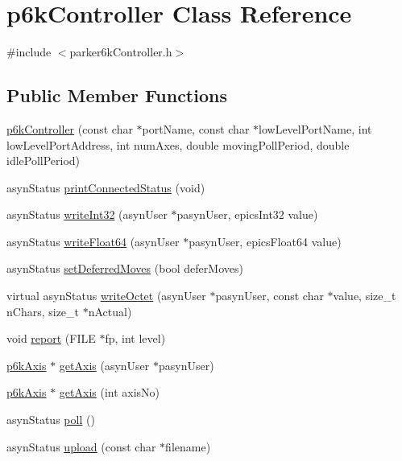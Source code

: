\hypertarget{classp6kController}{
\section{p6kController Class Reference}
\label{classp6kController}
}


{\ttfamily \#include $<$parker6kController.h$>$}\subsection*{Public Member Functions}
\begin{DoxyCompactItemize}
\item 
\hyperlink{classp6kController_ac4f52e54e4f8047ac602b2760aaa0792}{p6kController} (const char $\ast$portName, const char $\ast$lowLevelPortName, int lowLevelPortAddress, int numAxes, double movingPollPeriod, double idlePollPeriod)
\item 
asynStatus \hyperlink{classp6kController_a5089092687d5a2ebaf54d5a06d23a185}{printConnectedStatus} (void)
\item 
asynStatus \hyperlink{classp6kController_a9130075d7f114acc2a35a53a85b5431a}{writeInt32} (asynUser $\ast$pasynUser, epicsInt32 value)
\item 
asynStatus \hyperlink{classp6kController_a9a0b81dabca6419fafe18f36f9abb2e9}{writeFloat64} (asynUser $\ast$pasynUser, epicsFloat64 value)
\item 
asynStatus \hyperlink{classp6kController_ad8b3998f6cfb1016e86aff07eb318aca}{setDeferredMoves} (bool deferMoves)
\item 
virtual asynStatus \hyperlink{classp6kController_a673297b9788a7a52afb9ed452eb7c03e}{writeOctet} (asynUser $\ast$pasynUser, const char $\ast$value, size\_\-t nChars, size\_\-t $\ast$nActual)
\item 
void \hyperlink{classp6kController_ae352b601eee75d91883b6955fafa25c8}{report} (FILE $\ast$fp, int level)
\item 
\hyperlink{classp6kAxis}{p6kAxis} $\ast$ \hyperlink{classp6kController_a0790d66b39dbebbb6265bcabb167e3a5}{getAxis} (asynUser $\ast$pasynUser)
\item 
\hyperlink{classp6kAxis}{p6kAxis} $\ast$ \hyperlink{classp6kController_a1895dba80778089467a1a5d4554fd4bb}{getAxis} (int axisNo)
\item 
asynStatus \hyperlink{classp6kController_abc19f869fb74f3854cd9a664b3e35ded}{poll} ()
\item 
asynStatus \hyperlink{classp6kController_a01dd35adfa9e7382ce2314f301f15fda}{upload} (const char $\ast$filename)
\end{DoxyCompactItemize}
